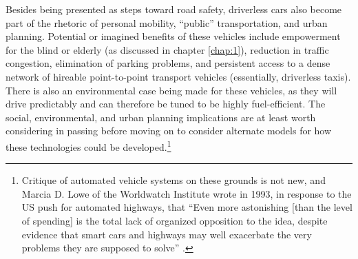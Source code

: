 Besides being presented as steps toward road safety, driverless cars
also become part of the rhetoric of personal mobility, ``public''
transportation, and urban planning. Potential or imagined
benefits of these vehicles include empowerment for the blind or
elderly (as discussed in chapter \ref{chap:1}), reduction in
traffic congestion, elimination of parking problems, and
persistent access to a dense network of hireable point-to-point
transport vehicles (essentially, driverless taxis). There is
  also an environmental case being made for these vehicles, as they
  will drive predictably and can therefore be tuned to be highly
  fuel-efficient. The social, environmental, and urban planning
implications are at least worth considering in passing before moving
on to consider alternate models for how these technologies could be
developed.\footnote{Critique of automated vehicle systems on these
  grounds is not new, and Marcia D. Lowe of the Worldwatch
    Institute wrote in 1993, in response to
the US push for automated highways, that ``Even more astonishing [than
  the level of spending] is
the total lack of organized opposition to the idea, despite evidence
that smart cars and highways may well exacerbate the very problems
they are supposed to solve'' \cite{novakNationalAutomated}.}

